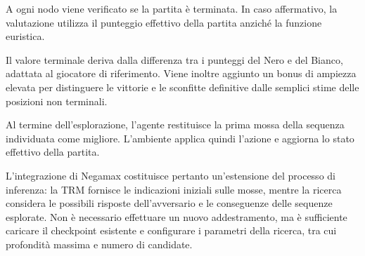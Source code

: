 A ogni nodo viene verificato se la partita è terminata. In caso affermativo, la valutazione utilizza il punteggio effettivo della partita anziché la funzione euristica.

Il valore terminale deriva dalla differenza tra i punteggi del Nero e del Bianco, adattata al giocatore di riferimento. Viene inoltre aggiunto un bonus di ampiezza elevata per distinguere le vittorie e le sconfitte definitive dalle semplici stime delle posizioni non terminali.

Al termine dell'esplorazione, l'agente restituisce la prima mossa della sequenza individuata come migliore. L'ambiente applica quindi l'azione e aggiorna lo stato effettivo della partita.

L'integrazione di Negamax costituisce pertanto un'estensione del processo di inferenza: la TRM fornisce le indicazioni iniziali sulle mosse, mentre la ricerca considera le possibili risposte dell'avversario e le conseguenze delle sequenze esplorate. Non è necessario effettuare un nuovo addestramento, ma è sufficiente caricare il checkpoint esistente e configurare i parametri della ricerca, tra cui profondità massima e numero di candidate.
